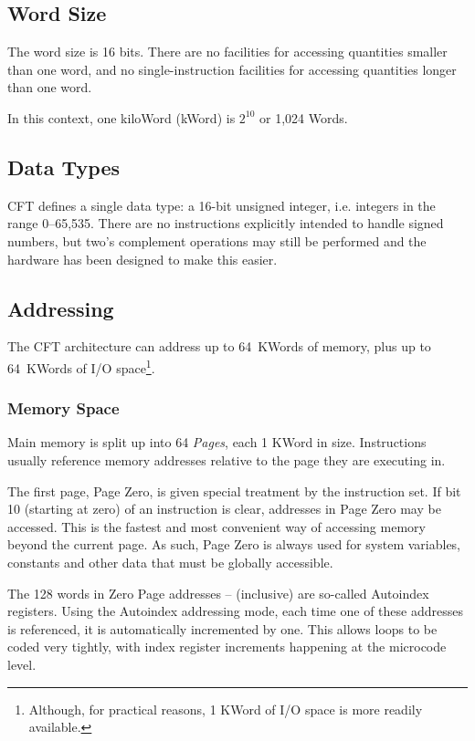 \subsection{Word Size}

The word size is 16 bits. There are no facilities for accessing
quantities smaller than one word, and no single-instruction facilities
for accessing quantities longer than one word.

In this context, one kiloWord (kWord) is $2^{10}$ or 1,024 Words.

\subsection{Data Types}

CFT defines a single data type: a 16-bit unsigned integer,
i.e. integers in the range 0–65,535. There are no instructions
explicitly intended to handle signed numbers, but two's complement
operations may still be performed and the hardware has been designed
to make this easier.

\subsection{Addressing}

The CFT architecture can address up to 64~KWords of memory, plus up to
64~KWords of I/O space\footnote{Although, for practical reasons, 1
  KWord of I/O space is more readily available.}.

\subsubsection{Memory Space}
\label{sec:memory-space}

Main memory is split up into 64 {\em \gls{Page}s\/}, each 1 KWord in
size. Instructions usually reference memory addresses relative to the
page they are executing in.

The first page, Page Zero, is given special treatment by the
instruction set. If bit 10 (starting at zero) of an instruction is
clear, addresses in Page Zero may be accessed. This is the fastest and
most convenient way of accessing memory beyond the current page. As
such, Page Zero is always used for system variables, constants and
other data that must be globally accessible.

The 128 words in Zero Page addresses – (inclusive)
are so-called Autoindex \glspl{register}. Using the Autoindex addressing
mode, each time one of these addresses is referenced, it is
automatically incremented by one. This allows loops to be coded very
tightly, with index register increments happening at the microcode
level.

